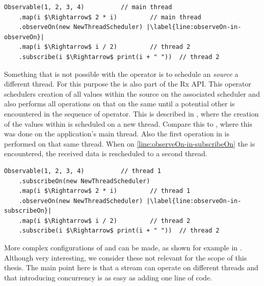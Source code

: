 \begin{minipage}{\linewidth}
\begin{lstlisting}[style=ScalaStyle, caption={\code{observeOn} in a Rx sequence}, label={lst:observeOn}]
Observable(1, 2, 3, 4)			// main thread
    .map(i $\Rightarrow$ 2 * i)			// main thread
    .observeOn(new NewThreadScheduler) |\label{line:observeOn-in-observeOn}|
    .map(i $\Rightarrow$ i / 2)			// thread 2
    .subscribe(i $\Rightarrow$ print(i + " "))	// thread 2
\end{lstlisting}
\end{minipage}

Something that is not possible with the  operator is to schedule an \obs \textit{source} a different thread. For this purpose the  is also part of the Rx API. This operator schedulers creation of all values within the source on the associated scheduler and also performs all operations on that \obs on the same \sch until a potential other \sch is encountered in the sequence of operator. This is described in , where the creation of the values within  is scheduled on a new thread. Compare this to , where this was done on the application's main thread. Also the first  operation in  is performed on that same thread. When on \cref{line:observeOn-in-subscribeOn} the  is encountered, the received data is rescheduled to a second thread.

\begin{minipage}{\linewidth}
\begin{lstlisting}[style=ScalaStyle, caption={\code{subscribeOn} in a Rx sequence}, label={lst:subscribeOn}]
Observable(1, 2, 3, 4)			// thread 1
    .subscribeOn(new NewThreadScheduler)
    .map(i $\Rightarrow$ 2 * i)			// thread 1
    .observeOn(new NewThreadScheduler) |\label{line:observeOn-in-subscribeOn}|
    .map(i $\Rightarrow$ i / 2)			// thread 2
    .subscribe(i $\Rightarrow$ print(i + " "))	// thread 2
\end{lstlisting}
\end{minipage}

More complex configurations of  and  can be made, as shown for example in \cite{RxJava-Scheduling}. Although very interesting, we consider these not relevant for the scope of this thesis. The main point here is that a stream can operate on different threads and that introducing concurrency is as easy as adding one line of code.